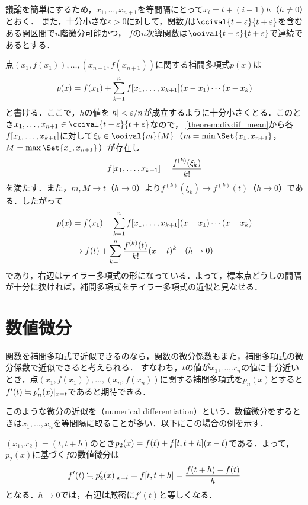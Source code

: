 \documentclass[../../main]{subfiles}
\begin{document}
議論を簡単にするため，\(x_1,\dots,x_{n+1}\)を等間隔にとって\(x_i=t+(i-1)h\)（\(h\neq 0\)）とおく．
また，十分小さな\(\varepsilon>0\)に対して，関数\(f\)は\(\ccival{t-\varepsilon}{t+\varepsilon}\)を含むある開区間で\(n\)階微分可能かつ，
\(f\)の\(n\)次導関数は\(\ooival{t-\varepsilon}{t+\varepsilon}\)で連続であるとする．

点\((x_1,f(x_1)),\dots,(x_{n+1},f(x_{n+1}))\)に関する補間多項式\(p(x)\)は
\[
  p(x) = f(x_1)+\sum_{k=1}^n\divdiff[f]{x_1,\dots,x_{k+1}}(x-x_1)\dotsm(x-x_k)
\]
と書ける．ここで，\(h\)の値を\(\abs{h}<\varepsilon/n\)が成立するように十分小さくとる．このとき\(x_1,\dots,x_{n+1}\in\ccival{t-\varepsilon}{t+\varepsilon}\)なので，
\cref{theorem:divdif_mean}から各\(\divdiff[f]{x_1,\dots,x_{k+1}}\)に対して\(\xi_k\in\ooival{m}{M}\)（\(m=\min\Set{x_1,x_{n+1}}\)，\(M=\max\Set{x_1,x_{n+1}}\)）が存在し
\[
  \divdiff[f]{x_1,\dots,x_{k+1}} = \frac{f^{(k)}(\xi_k)}{k!}
\]
を満たす．また，\(m,M\to t\)（\(h\to 0\)）より\(f^{(k)}(\xi_k)\to f^{(k)}(t)\)（\(h\to 0\)）である．したがって
\begin{align*}
  p(x) &=f(x_1)+\sum_{k=1}^n\divdiff[f]{x_1,\dots,x_{k+1}}(x-x_1)\dotsm (x-x_k) \\
  &\to f(t)+\sum_{k=1}^n\frac{f^{(k)}(t)}{k!}(x-t)^k\quad(h\to 0)
\end{align*}
であり，右辺はテイラー多項式の形になっている．よって，標本点どうしの間隔が十分に狭ければ，補間多項式をテイラー多項式の近似と見なせる．

\section{数値微分}
関数を補間多項式で近似できるのなら，関数の微分係数もまた，補間多項式の微分係数で近似できると考えられる．
すなわち，\(t\)の値が\(x_1,\dots,x_n\)の値に十分近いとき，点\((x_1,f(x_1)),\dots,(x_n,f(x_n))\)に関する補間多項式を\(p_n(x)\)とすると\(f'(t)\fallingdotseq\eval{p_n'(x)}_{x=t}\)であると期待できる．

このような微分の近似を（numerical differentiation）という．数値微分をするときは\(x_1,\dots,x_n\)を等間隔に取ることが多い．以下にこの場合の例を示す．

\begin{example}
\label{example:numerical_differentiation_1}
\((x_1,x_2)=(t,t+h)\)のとき\(p_2(x)=f(t)+\divdiff[f]{t,t+h}(x-t)\)である．よって，\(p_2(x)\)に基づく\(f\)の数値微分は
\[
  f'(t) \fallingdotseq \eval{p_2'(x)}_{x=t}
  = \divdiff[f]{t,t+h}
  = \frac{f(t+h)-f(t)}{h}
\]
となる．\(h\to 0\)では，右辺は厳密に\(f'(t)\)と等しくなる．
\end{example}
\end{document}

